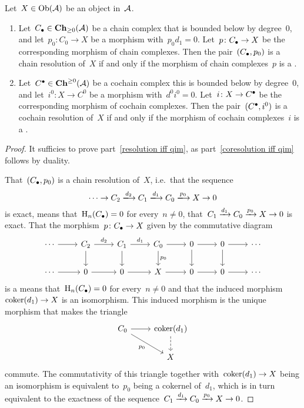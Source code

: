 \begin{lemma}
  Let~$X \in \operatorname{Ob}(\mathcal{A})$ be an object in~$\mathcal{A}$.
  \begin{enumerate}
    \item
      \label{resolution iff qim}
      Let~$C_\bullet \in \mathbf{Ch}_{\geq 0}(\mathcal{A})$ be a chain complex that is bounded below by degree~$0$, and let~$p_0 \colon C_0 \to X$ be a morphism with~$p_0 d_1 = 0$.
      Let~$p \colon C_\bullet \to X$ be the corresponding morphism of chain complexes.
      Then the pair~$(C_\bullet, p_0)$ is a chain resolution of~$X$ if and only if the morphism of chain complexes~$p$ is a {\qim}.
    \item
      \label{coresolution iff qim}
      Let~$C^\bullet \in \mathbf{Ch}^{\geq 0}(\mathcal{A})$ be a cochain complex this is bounded below by degree~$0$, and let~$i^0 \colon X \to C^0$ be a morphism with~$d^0 i^0 = 0$.
      Let~$i \colon X \to C^\bullet$ be the corresponding morphism of cochain complexes.
      Then the pair~$(C^\bullet, i^0)$ is a cochain resolution of~$X$ if and only if the morphism of cochain complexes~$i$ is a {\qim}.
  \end{enumerate}
\end{lemma}


\begin{proof}
  It sufficies to prove part~\ref*{resolution iff qim}, as part~\ref*{coresolution iff qim} follows by duality.
  
  That~$(C_\bullet, p_0)$ is a chain resolution of~$X$, i.e.\ that the sequence
  \[
    \dotsb
    \to
    C_2
    \xlongto{d_2}
    C_1
    \xlongto{d_1}
    C_0
    \xlongto{p_0}
    X
    \to
    0
  \]
  is exact, means that~$\operatorname{H}_n(C_\bullet) = 0$ for every~$n \neq 0$, that~$C_1 \xrightarrow{d_1} C_0 \xrightarrow{p_0} X \to 0$ is exact.
  That the morphism~$p \colon C_\bullet \to X$ given by the commutative diagram
  \[
    \begin{tikzcd}
        \dotsb
        \arrow{r}
      & C_2
        \arrow{r}[above]{d_2}
        \arrow{d}
      & C_1
        \arrow{r}[above]{d_1}
        \arrow{d}
      & C_0
        \arrow{r}
        \arrow{d}[right]{p_0}
      & 0
        \arrow{r}
        \arrow{d}
      & 0
        \arrow{r}
        \arrow{d}
      & \dotsb
      \\
        \dotsb
        \arrow{r}
      & 0
        \arrow{r}
      & 0
        \arrow{r}
      & X
        \arrow{r}
      & 0
        \arrow{r}
      & 0
        \arrow{r}
      & \dotsb
    \end{tikzcd}
  \]
  is a {\qim} means that~$\operatorname{H}_n(C_\bullet) = 0$ for every~$n \neq 0$ and that the induced morphism~$\operatorname{coker}(d_1) \to X$ is an isomorphism.
  This induced morphism is the unique morphism that makes the triangle
  \[
    \begin{tikzcd}
        C_0
        \arrow{r}
        \arrow{dr}[below left]{p_0}
      & \coker(d_1)
        \arrow[dashed]{d}
      \\
        {}
      & X
    \end{tikzcd}
  \]
  commute.
  The commutativity of this triangle together with~$\operatorname{coker}(d_1) \to X$ being an isomorphism is equivalent to~$p_0$ being a cokernel of~$d_1$, which is in turn equivalent to the exactness of the sequence~$C_1 \xrightarrow{d_1} C_0 \xrightarrow{p_0} X \to 0$.
\end{proof}


